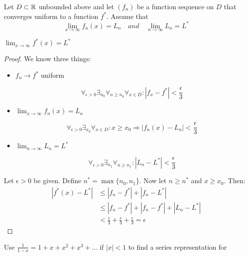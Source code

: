 \documentclass[week=11]{homework}
\date{\today}
\begin{document}
	\maketitle
	\thispagestyle{empty}
	\newpage
	\begin{questions}
		\let\firstquestion\question
		\renewcommand*{\question}{\vspace{7mm}\firstquestion}
		\firstquestion
		Let $D \subset \mathbb{R}$ unbounded above and let $(f_n)$ be a function sequence on $D$ that converges uniform to a function $f^*$. Assume that 
		\[
			\lim_{x \to \infty} f_n(x) = L_n \quad and \quad \lim_{n \to \infty} L_n = L^* 
		\]
		\begin{toprove}
			$\lim_{x \to \infty} f^*(x) = L^*$
		\end{toprove}
		\begin{proof}
			We know three things:
			\begin{itemize}
				\item $f_n \to f^*$ uniform
				
				\[
					\forall_{\epsilon > 0} \exists_{n_0} \forall_{n \ge n_0} \forall_{x \in D}: |f_x - f^*| < \frac{\epsilon}{3}
				\]
				
				\item  $\lim_{x \to \infty} f_n(x) = L_n$
				
				\[
					\forall_{\epsilon > 0} \exists_{x_0} \forall_{x \in D} : x \ge x_0 \Rightarrow |f_n(x) - L_n| < \frac{\epsilon}{3}
				\]
				\item  $\lim_{n \to \infty} L_n = L^*$
				
				\[
					\forall_{\epsilon > 0} \exists_{n_1} \forall_{n \ge n_1} : |L_n - L^*| < \frac{\epsilon}{3}
				\] 
			\end{itemize}
			
			Let $\epsilon > 0$ be given. Define $n^* = \max\{n_0, n_1\}$. Now let $n \ge n^*$ and $x \ge x_0$. Then:
			\begin{align*}
				|f^*(x) - L^*| &\le |f_n - f^*| + |f_n - L^*|  \\
				&\le |f_n - f^*| + |f_n - f^*| + |L_n - L^*| \\
				&< \frac{\epsilon}{3} + \frac{\epsilon}{3} + \frac{\epsilon}{3} = \epsilon
			\end{align*}
		\end{proof}
		
		\question 
		Use $\frac{1}{1 - x} = 1 + x + x^2 + x^3 + ...$ if $|x| < 1$ to find a series representation for 
\end{questions}
\end{document}
